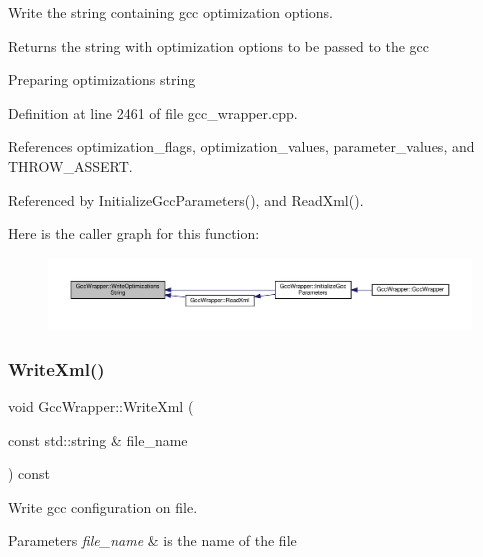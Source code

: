 Write the string containing gcc optimization options. 

\begin{DoxyReturn}{Returns}
the string with optimization options to be passed to the gcc 
\end{DoxyReturn}
Preparing optimizations string 

Definition at line 2461 of file gcc\+\_\+wrapper.\+cpp.



References optimization\+\_\+flags, optimization\+\_\+values, parameter\+\_\+values, and T\+H\+R\+O\+W\+\_\+\+A\+S\+S\+E\+RT.



Referenced by Initialize\+Gcc\+Parameters(), and Read\+Xml().

Here is the caller graph for this function\+:
\nopagebreak
\begin{figure}[H]
\begin{center}
\leavevmode
\includegraphics[width=350pt]{d4/dbf/classGccWrapper_ab15234a29c83e2ed44b89297ebbcd0d1_icgraph}
\end{center}
\end{figure}
\mbox{\label{classGccWrapper_a34ebfe793ec69e13bea2d0996d3c9bcd}} 
\subsubsection{\texorpdfstring{Write\+Xml()}{WriteXml()}}
{\footnotesize\ttfamily void Gcc\+Wrapper\+::\+Write\+Xml (\begin{DoxyParamCaption}\item[{const std\+::string \&}]{file\+\_\+name }\end{DoxyParamCaption}) const}



Write gcc configuration on file. 


\begin{DoxyParams}{Parameters}
{\em file\+\_\+name} & is the name of the file \\
\hline
\end{DoxyParams}


